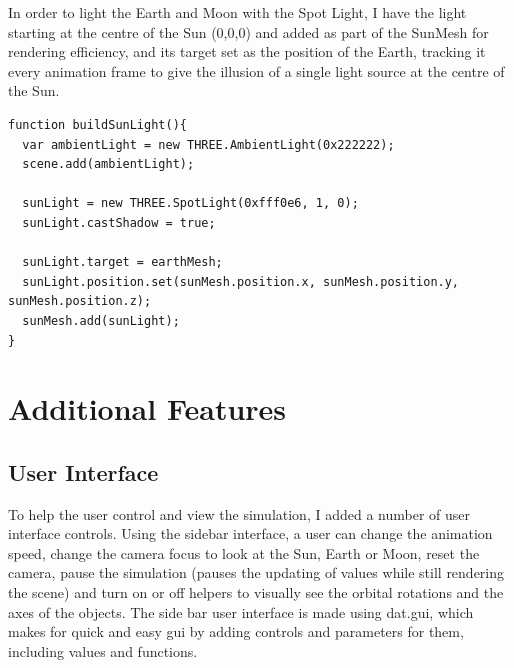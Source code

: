 \documentclass[12pt]{article}
\begin{document}
In order to light the Earth and Moon with the Spot Light, I have the light starting at the centre of the Sun (0,0,0) and added as part of the SunMesh for rendering efficiency, and its target set as the position of the Earth, tracking it every animation frame to give the illusion of a single light source at the centre of the Sun.

\begin{lstlisting}
function buildSunLight(){
  var ambientLight = new THREE.AmbientLight(0x222222);
  scene.add(ambientLight);

  sunLight = new THREE.SpotLight(0xfff0e6, 1, 0);
  sunLight.castShadow = true;

  sunLight.target = earthMesh;    
  sunLight.position.set(sunMesh.position.x, sunMesh.position.y, sunMesh.position.z);
  sunMesh.add(sunLight);
}
\end{lstlisting}


\section{Additional Features}
\subsection{User Interface}
To help the user control and view the simulation, I added a number of user interface controls. Using the sidebar interface, a user can change the animation speed, change the camera focus to look at the Sun, Earth or Moon, reset the camera, pause the simulation (pauses the updating of values while still rendering the scene) and turn on or off helpers to visually see the orbital rotations and the axes of the objects. The side bar user interface is made using dat.gui\cite{datgui}, which makes for quick and easy gui by adding controls and parameters for them, including values and functions.
\end{document}
